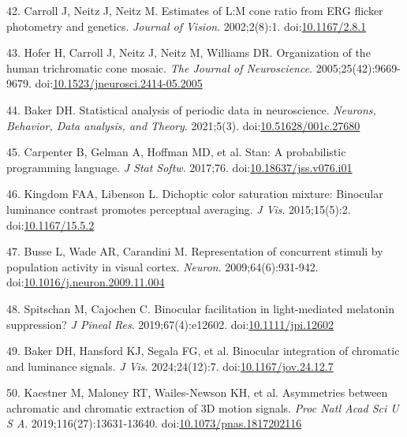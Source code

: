 \documentclass[
]{article}
\begin{document}
\leavevmode\hypertarget{ref-Carroll2002}{}%
42. Carroll J, Neitz J, Neitz M. Estimates of L:M cone ratio from ERG flicker photometry and genetics. \emph{Journal of Vision}. 2002;2(8):1. doi:\href{https://doi.org/10.1167/2.8.1}{10.1167/2.8.1}

\leavevmode\hypertarget{ref-Hofer2005}{}%
43. Hofer H, Carroll J, Neitz J, Neitz M, Williams DR. Organization of the human trichromatic cone mosaic. \emph{The Journal of Neuroscience}. 2005;25(42):9669-9679. doi:\href{https://doi.org/10.1523/jneurosci.2414-05.2005}{10.1523/jneurosci.2414-05.2005}

\leavevmode\hypertarget{ref-Baker2021}{}%
44. Baker DH. Statistical analysis of periodic data in neuroscience. \emph{Neurons, Behavior, Data analysis, and Theory}. 2021;5(3). doi:\href{https://doi.org/10.51628/001c.27680}{10.51628/001c.27680}

\leavevmode\hypertarget{ref-Carpenter2017}{}%
45. Carpenter B, Gelman A, Hoffman MD, et al. Stan: A probabilistic programming language. \emph{J Stat Softw}. 2017;76. doi:\href{https://doi.org/10.18637/jss.v076.i01}{10.18637/jss.v076.i01}

\leavevmode\hypertarget{ref-Kingdom2015}{}%
46. Kingdom FAA, Libenson L. Dichoptic color saturation mixture: Binocular luminance contrast promotes perceptual averaging. \emph{J Vis}. 2015;15(5):2. doi:\href{https://doi.org/10.1167/15.5.2}{10.1167/15.5.2}

\leavevmode\hypertarget{ref-Busse2009}{}%
47. Busse L, Wade AR, Carandini M. Representation of concurrent stimuli by population activity in visual cortex. \emph{Neuron}. 2009;64(6):931-942. doi:\href{https://doi.org/10.1016/j.neuron.2009.11.004}{10.1016/j.neuron.2009.11.004}

\leavevmode\hypertarget{ref-Spitschan2019}{}%
48. Spitschan M, Cajochen C. Binocular facilitation in light-mediated melatonin suppression? \emph{J Pineal Res}. 2019;67(4):e12602. doi:\href{https://doi.org/10.1111/jpi.12602}{10.1111/jpi.12602}

\leavevmode\hypertarget{ref-Baker2024}{}%
49. Baker DH, Hansford KJ, Segala FG, et al. Binocular integration of chromatic and luminance signals. \emph{J Vis}. 2024;24(12):7. doi:\href{https://doi.org/10.1167/jov.24.12.7}{10.1167/jov.24.12.7}

\leavevmode\hypertarget{ref-Kaestner2019}{}%
50. Kaestner M, Maloney RT, Wailes-Newson KH, et al. Asymmetries between achromatic and chromatic extraction of 3D motion signals. \emph{Proc Natl Acad Sci U S A}. 2019;116(27):13631-13640. doi:\href{https://doi.org/10.1073/pnas.1817202116}{10.1073/pnas.1817202116}
\end{document}
